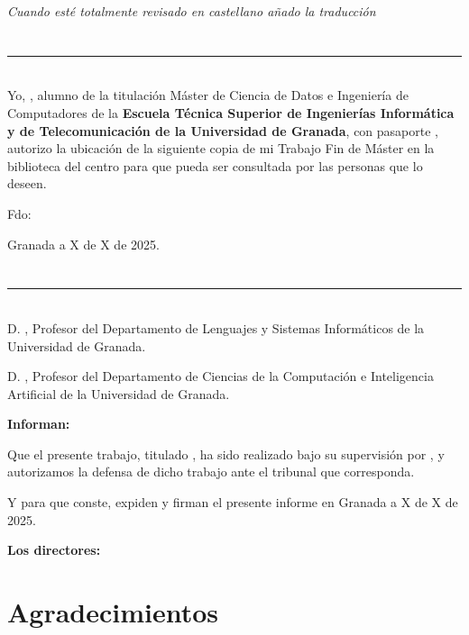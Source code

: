 \textit{Cuando esté totalmente revisado en castellano añado la traducción}
\chapter*{}
\thispagestyle{empty}

\noindent\rule[-1ex]{\textwidth}{2pt}\\[4.5ex]

Yo, \textbf{\myName}, alumno de la titulación Máster de Ciencia de Datos e Ingeniería de Computadores de la \textbf{Escuela Técnica Superior
de Ingenierías Informática y de Telecomunicación de la Universidad de Granada}, con pasaporte \myDNI, autorizo la
ubicación de la siguiente copia de mi Trabajo Fin de Máster en la biblioteca del centro para que pueda ser
consultada por las personas que lo deseen.

\vspace{6cm}

\noindent Fdo: \myName

\vspace{2cm}

\begin{flushright}
Granada a X de X de 2025.
\end{flushright}


\chapter*{}
\thispagestyle{empty}

\noindent\rule[-1ex]{\textwidth}{2pt}\\[4.5ex]

D. \textbf{\myProf}, Profesor del Departamento de Lenguajes y Sistemas Informáticos de la Universidad de Granada.

\vspace{0.25cm}

D. \textbf{\myOtherProf}, Profesor del Departamento de Ciencias de la Computación e Inteligencia Artificial de la Universidad de Granada.


\vspace{0.25cm}

\textbf{Informan:}

\vspace{0.25cm}

Que el presente trabajo, titulado \textit{\textbf{\myTitle}},
ha sido realizado bajo su supervisión por \textbf{\myName}, y autorizamos la defensa de dicho trabajo ante el tribunal
que corresponda.

\vspace{0.5cm}

Y para que conste, expiden y firman el presente informe en Granada a X de X de 2025.

\vspace{0.5cm}

\textbf{Los directores:}

\vspace{5cm}

\noindent \textbf{\myProf \hfill
\myOtherProf}

\chapter*{Agradecimientos}
\thispagestyle{empty}

       \vspace{1cm}
